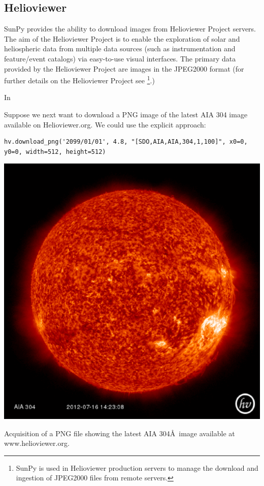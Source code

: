 \subsection{Helioviewer}\label{ssec:hv}

SunPy provides the ability to download images from Helioviewer Project
servers.  The aim of the Helioviewer Project is to enable the
exploration of solar and heliospheric data from multiple data sources
(such as instrumentation and feature/event catalogs) via easy-to-use
visual interfaces.  The primary data provided by the Helioviewer
Project are images in the JPEG2000 format (for further details on the
Helioviewer Project see \cite{}\footnote{SunPy is used in Helioviewer
  production servers to manage the download and ingestion of JPEG2000
  files from remote servers.}.)

In

Suppose we next want to download a PNG image of the latest AIA 304
image available on Helioviewer.org. We could use the explicit
approach:

\begin{listing}
\begin{verbatim}
hv.download_png('2099/01/01', 4.8, "[SDO,AIA,AIA,304,1,100]", x0=0, y0=0, width=512, height=512)
\end{verbatim}
\includegraphics[width=0.8\columnwidth]{helioviewer_latest_aia_304.eps}
\caption{Acquisition of a PNG file showing the latest AIA 304\AA\ image available at
  www.helioviewer.org.}
\label{code:downloadlatestpng}
\end{listing}

